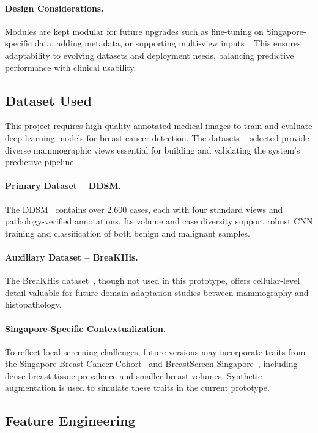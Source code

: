\documentclass[12pt]{article}
\begin{document}
\paragraph{Design Considerations.}
Modules are kept modular for future upgrades such as fine-tuning on Singapore-specific data, adding metadata, or supporting multi-view inputs~\cite{8}. This ensures adaptability to evolving datasets and deployment needs, balancing predictive performance with clinical usability.

\subsection{Dataset Used}
This project requires high-quality annotated medical images to train and evaluate deep learning models for breast cancer detection. The datasets ~\cite{cbis_ddsm_kaggle} selected provide diverse mammographic views essential for building and validating the system’s predictive pipeline.

\paragraph{Primary Dataset – DDSM.}
The DDSM~\cite{17} contains over 2,600 cases, each with four standard views and pathology-verified annotations. Its volume and case diversity support robust CNN training and classification of both benign and malignant samples.

\paragraph{Auxiliary Dataset – BreaKHis.}
The BreaKHis dataset~\cite{18}, though not used in this prototype, offers cellular-level detail valuable for future domain adaptation studies between mammography and histopathology.

\paragraph{Singapore-Specific Contextualization.}
To reflect local screening challenges, future versions may incorporate traits from the Singapore Breast Cancer Cohort~\cite{6} and BreastScreen Singapore~\cite{19}, including dense breast tissue prevalence and smaller breast volumes. Synthetic augmentation is used to simulate these traits in the current prototype.

\subsection{Feature Engineering}
\label{subsection:Feature Engineering}
\end{document}
